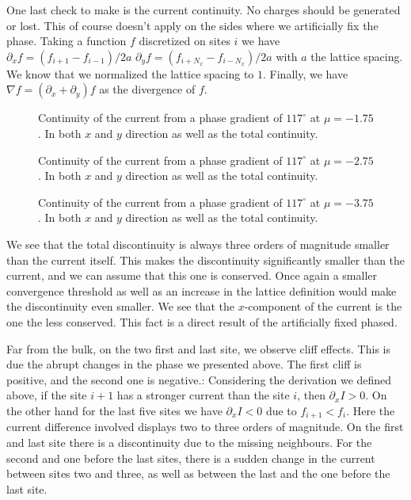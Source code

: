 \documentclass[..\main.tex]{subfile}
\begin{document}
One last check to make is the current continuity. No charges should be generated or lost. This of course doesn't apply on
the sides where we artificially fix the phase. Taking a function $f$ discretized on sites $i$ we have $\partial_x f = (f_{i+1} - f_{i-1} )/2a$
$\partial_y f = (f_{i+N_x} - f_{i-N_x} )/2a$ with
$a$ the lattice spacing. We know that we normalized the lattice spacing to $1$. Finally, we have $\nabla f = (\partial_x + \partial_y) f$ as the divergence
of $f$.
\begin{figure}[H]
    
    \caption{Continuity of the current from a phase gradient of $117^{\circ}$ at $\mu = -1.75$. In both $x$ and $y$ direction as
    well as the total continuity.}
\end{figure}
\begin{figure}[H]
    
    \caption{Continuity of the current from a phase gradient of $117^{\circ}$ at $\mu = -2.75$. In both $x$ and $y$ direction as
    well as the total continuity.}
\end{figure}
\begin{figure}[H]
    
    \caption{Continuity of the current from a phase gradient of $117^{\circ}$ at $\mu = -3.75$. In both $x$ and $y$ direction as
    well as the total continuity.}
\end{figure}
We see that the total discontinuity is always three orders of magnitude smaller than the current itself. This makes the discontinuity
significantly smaller than the current, and we can assume that this one is conserved. Once again a smaller convergence threshold
as well as an increase in the lattice definition would make the discontinuity even smaller.
We see that the $x$-component of the current is the one the less conserved. This fact is a direct result of the artificially fixed phased.

Far from the bulk, on the two first and last site, we observe cliff effects. This is due the abrupt changes in the phase we presented above.
The first cliff is positive, and the second one is negative.:
Considering the derivation we defined above, if the site $i+1$ has a stronger current than the site $i$, then $\partial_x I > 0$.
On the other hand for the last five sites we have $\partial_x I <0$ due to $f_{i+1}< f_i$. Here the current difference involved displays two to three orders of magnitude.
On the first and last site there is a discontinuity due to the missing neighbours. For the second and one before the last sites, there is a sudden change in the current
between sites two and three, as well as between the last and the one before the last site.\\
\end{document}
